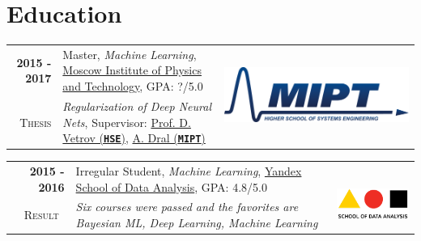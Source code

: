 \documentclass[a4paper,10pt]{article} %
\begin{document}

\section{Education}

\begin{tabular}{rp{14cm}c}	
	\textbf{2015 -  2017} & Master, \emph{Machine Learning}, \href{https://mipt.ru/english}{Moscow Institute of Physics and Technology}, GPA: ?/5.0& \multirow{2}{*}{\includegraphics[scale=0.15]{img/mipt}}\\
	\textsc{Thesis} & \emph{Regularization of Deep Neural Nets}, Supervisor: \href{https://www.hse.ru/staff/dvetrov}{Prof. D. Vetrov (\texttt{\textbf{HSE}})}, \href{https://ru.linkedin.com/in/alexey-dral}{A. Dral (\texttt{\textbf{MIPT}})}
\end{tabular}

\begin{tabular}{rp{14cm}c}	
	\textbf{2015 -  2016} & Irregular Student, \emph{Machine Learning}, \href{https://yandexdataschool.com/}{Yandex School of Data Analysis}, GPA: 4.8/5.0& \multirow{2}{*}{~~\includegraphics[scale=0.25]{img/shad}}\\
	\textsc{Result}~& \emph{Six courses were passed and the favorites are Bayesian ML, Deep Learning, Machine Learning}
\end{tabular}
\end{document}
